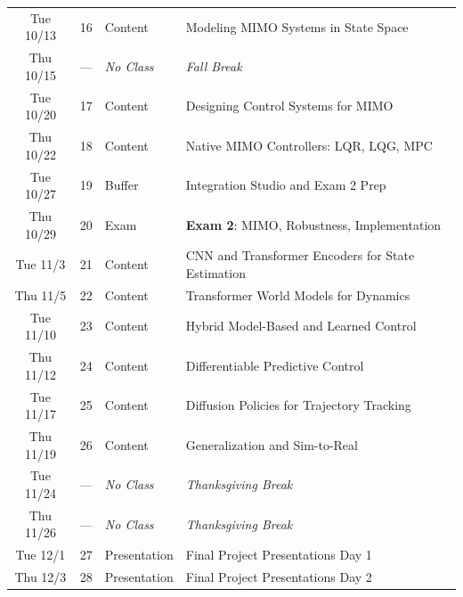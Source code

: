 \documentclass[11pt,letterpaper]{article}
\begin{document}
\begin{longtable}{c c l p{10cm}}
Tue 10/13 & 16 & Content & Modeling MIMO Systems in State Space \\
\rowcolor{breakrow}
Thu 10/15 & --- & \textit{No Class} & \textit{Fall Break} \\

Tue 10/20 & 17 & Content & Designing Control Systems for MIMO \\
Thu 10/22 & 18 & Content & Native MIMO Controllers: LQR, LQG, MPC \\

\rowcolor{bufferrow}
Tue 10/27 & 19 & Buffer & Integration Studio and Exam 2 Prep \\
\rowcolor{examrow}
Thu 10/29 & 20 & Exam & \textbf{Exam 2}: MIMO, Robustness, Implementation \\

Tue 11/3 & 21 & Content & CNN and Transformer Encoders for State Estimation \\
Thu 11/5 & 22 & Content & Transformer World Models for Dynamics \\

Tue 11/10 & 23 & Content & Hybrid Model-Based and Learned Control \\
Thu 11/12 & 24 & Content & Differentiable Predictive Control \\

Tue 11/17 & 25 & Content & Diffusion Policies for Trajectory Tracking \\
Thu 11/19 & 26 & Content & Generalization and Sim-to-Real \\

\rowcolor{breakrow}
Tue 11/24 & --- & \textit{No Class} & \textit{Thanksgiving Break} \\
\rowcolor{breakrow}
Thu 11/26 & --- & \textit{No Class} & \textit{Thanksgiving Break} \\

\rowcolor{presentrow}
Tue 12/1 & 27 & Presentation & Final Project Presentations Day 1 \\
\rowcolor{presentrow}
Thu 12/3 & 28 & Presentation & Final Project Presentations Day 2 \\

\end{longtable}
\end{document}
